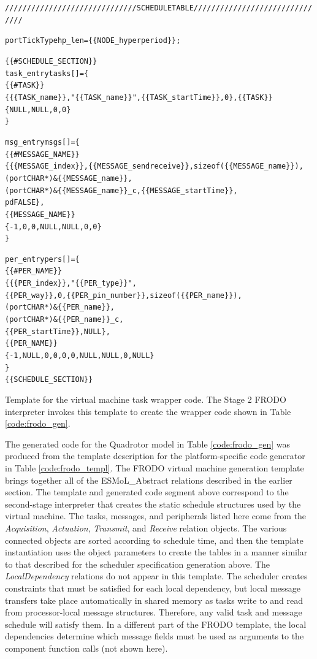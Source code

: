 \begin{table}
\centering
\begin{alltt}
////////////////////////////// SCHEDULE TABLE ///////////////////////////////

portTickType hp_len = \{\{NODE_hyperperiod\}\};

\{\{\#SCHEDULE_SECTION\}\}
task\_entry tasks[] = \{
\{\{\#TASK\}\}
   \{ \{\{TASK_name\}\}, "\{\{TASK_name\}\}", \{\{TASK\_startTime\}\}, 0\},\{\{\/TASK\}\}
   \{NULL, NULL, 0, 0\}
\}\;

msg\_entry msgs[] = \{
\{\{\#MESSAGE\_NAME\}\}
   \{ \{\{MESSAGE\_index\}\}, \{\{MESSAGE\_sendreceive\}\}, sizeof( \{\{MESSAGE\_name\}\} ), 
         (portCHAR *) \& \{\{MESSAGE\_name\}\}, 
         (portCHAR *) \& \{\{MESSAGE\_name\}\}\_c, \{\{MESSAGE\_startTime\}\}, 
         pdFALSE\},
\{\{\/MESSAGE\_NAME\}\}
   \{ -1, 0, 0, NULL, NULL, 0, 0\}
\}\;

per\_entry pers[] = \{
\{\{\#PER_NAME\}\}
   \{ \{\{PER\_index\}\}, "\{\{PER\_type\}\}", 
         \{\{PER\_way\}\}, 0, \{\{PER\_pin\_number\}\}, sizeof( \{\{PER\_name\}\} ), 
         (portCHAR *) \& \{\{PER\_name\}\}, 
         (portCHAR *) \& \{\{PER\_name\}\}\_c, 
         \{\{PER\_startTime\}\}, NULL\}, 
\{\{\/PER_NAME\}\}
   \{ -1, NULL, 0, 0, 0, 0, NULL, NULL, 0, NULL \}
\}\;
\{\{\/SCHEDULE_SECTION\}\}

\end{alltt}
\caption{Template for the virtual machine task wrapper code. The Stage 2 FRODO interpreter invokes
this template to create the wrapper code shown in Table \ref{code:frodo_gen}.}
\label{code:frodo_templ}
\end{table}

The generated code for the Quadrotor model in Table 
\ref{code:frodo_gen} was produced from the template description
for the platform-specific code generator in Table \ref{code:frodo_templ}.
The FRODO virtual machine generation template brings together all of the
ESMoL\_Abstract relations described in the earlier section.  
The template and generated code
segment above correspond to the second-stage 
interpreter that creates the static schedule
structures used by the virtual machine.  The tasks, 
messages, and peripherals listed here come from the 
\emph{Acquisition}, \emph{Actuation}, \emph{Transmit}, and 
\emph{Receive} relation objects.  The various connected 
objects are sorted according to schedule time, and then the 
template instantiation uses the object parameters
to create the tables in a manner similar to that 
described for the scheduler specification generation above.  
The \emph{LocalDependency} relations do not appear in this template.  
The scheduler creates constraints that must be
satisfied for each local dependency, but local message transfers take place automatically in shared memory as tasks write to and read from processor-local message structures.  Therefore, any valid task and message
schedule will satisfy them.  In a different part of the FRODO template, the
local dependencies determine which message fields must be used as
arguments to the component function calls (not shown here).

